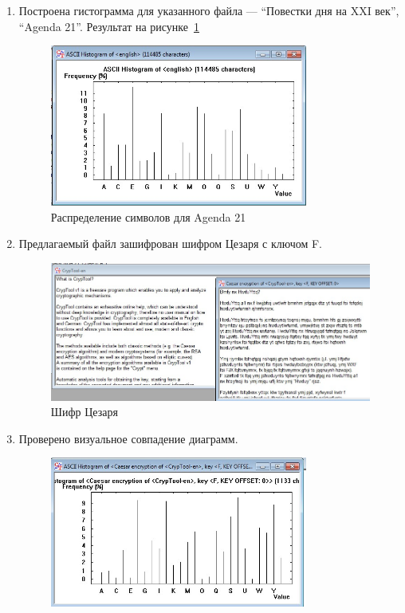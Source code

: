 \documentclass[a4paper, 14pt]{extarticle}
\begin{document}
\begin{enumerate}
    \item Построена гистограмма для указанного файла --- ``Повестки дня на XXI век'', ``Agenda 21''. Результат на рисунке~\ref{img:caesar:1}
    \begin{figure}[h]
        \centering
        \includegraphics[width=0.8\textwidth]{img/S008.jpg}
        \caption{Распределение символов для Agenda 21}%
        \label{img:caesar:1}
    \end{figure}
    \item Предлагаемый файл зашифрован шифром Цезаря с ключом F.
    \begin{figure}[h]
        \centering
        \includegraphics[width=\textwidth]{img/S009.jpg}
        \caption{Шифр Цезаря}%
        \label{img:caesar:2}
    \end{figure}
    \item Проверено визуальное совпадение диаграмм.
    \begin{figure}[h]
        \centering
        \includegraphics[width=0.8\textwidth]{img/S010.jpg}

\end{figure}
\end{enumerate}
\end{document}
